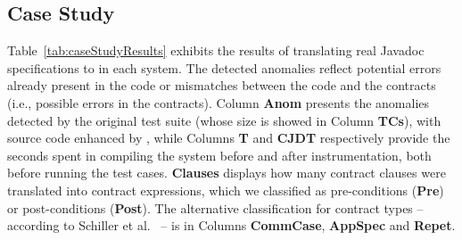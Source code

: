\subsection{Case Study}

Table~\ref{tab:caseStudyResults} exhibits the results of translating real Javadoc specifications to \contractjdoc{} in each system.
The detected anomalies reflect potential errors already present in the code or mismatches between the code and the contracts (i.e., possible errors in the contracts).
Column \textbf{Anom} presents the anomalies detected by the original test suite (whose size is showed in Column \textbf{TCs}), with source code enhanced by \contractjdoc{}, while Columns \textbf{T} and \textbf{CJDT} respectively provide the seconds spent in compiling the system before and after \contractjdoc{} instrumentation, both before running the test cases. 
\textbf{Clauses} displays how many contract clauses were translated into contract expressions, which we classified as pre-conditions (\textbf{Pre}) or post-conditions (\textbf{Post}). The alternative classification for contract types -- according to Schiller et al.~\cite{typeContracts} -- is in Columns \textbf{CommCase}, \textbf{AppSpec} and \textbf{Repet}.

